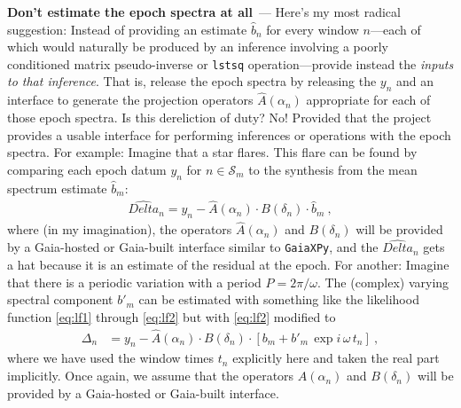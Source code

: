 \documentclass[11pt]{article}
\renewcommand{\paragraph}[1]{\medskip\par\noindent\textbf{#1}~---}
\begin{document}
\paragraph{Don't estimate the epoch spectra at all}
Here's my most radical suggestion: Instead of providing an estimate $\hat{b}_n$ for every window $n$---each of which would naturally be produced by an inference involving a poorly conditioned matrix pseudo-inverse or \texttt{lstsq} operation---provide instead the \emph{inputs to that inference}.
That is, release the epoch spectra by releasing the $y_n$ and an interface to generate the projection operators $\hat{A}(\alpha_n)$ appropriate for each of those epoch spectra.
Is this dereliction of duty? No! Provided that the project provides a usable interface for performing inferences or operations with the epoch spectra.
For example: Imagine that a star flares. This flare can be found by comparing each epoch datum $y_n$ for $n\in\mathscr{S}_m$ to the synthesis from the mean spectrum estimate $\hat{b}_m$:
\begin{align}
    \hat{Delta}_n = y_n - \hat{A}(\alpha_n)\cdot B(\delta_n)\cdot \hat{b}_m ~,
\end{align}
where (in my imagination), the operators $\hat{A}(\alpha_n)$ and $B(\delta_n)$ will be provided by a Gaia-hosted or Gaia-built interface similar to \texttt{GaiaXPy},
and the $\hat{Delta}_n$ gets a hat because it is an estimate of the residual at the epoch.
For another: Imagine that there is a periodic variation with a period $P=2\pi/\omega$.
The (complex) varying spectral component $b'_m$ can be estimated with something like the likelihood function \eqref{eq:lf1} through \eqref{eq:lf2} but with \eqref{eq:lf2} modified to
\begin{align}
    \Delta_n &= y_n - \hat{A}(\alpha_n)\cdot B(\delta_n)\cdot [b_m + b'_m\,\exp{i\,\omega\,t_n}] ~,
\end{align}
where we have used the window times $t_n$ explicitly here and taken the real part implicitly.
Once again, we assume that the operators $\hat{A}(\alpha_n)$ and $B(\delta_n)$ will be provided by a Gaia-hosted or Gaia-built interface.
\end{document}
